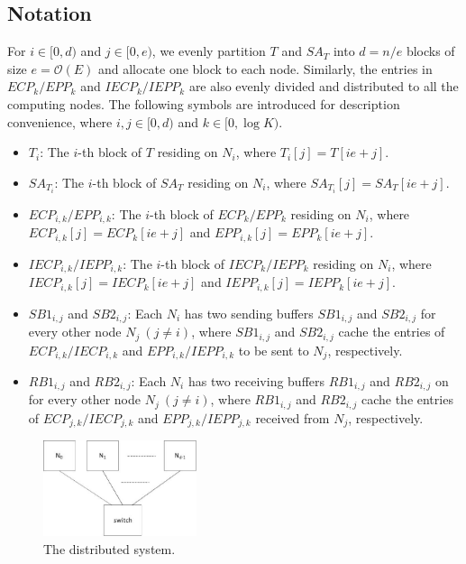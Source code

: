 \documentclass[10pt,journal,compsoc]{IEEEtran}
\begin{document}
\begin{CJK*}{GBK}{song}
\subsection{Notation}

For $i\in [0,d)$ and $j\in [0,e)$, we evenly partition $T$ and $SA_T$ into $d=n/e$ blocks of size $e=\mathcal{O}(E)$ and allocate one block to each node. Similarly, the entries in $ECP_k/EPP_k$ and $IECP_k/IEPP_k$ are also evenly divided and distributed to all the computing nodes. The following symbols are introduced for description convenience, where $i,j\in [0,d)$ and $k\in [0,\log K)$.

\begin{itemize}
\item $T_i$: The $i$-th block of $T$ residing on $N_i$, where $T_i[j] = T[ie+j]$.
\item $SA_{T_i}$: The $i$-th block of $SA_T$ residing on $N_i$, where $SA_{T_i}[j] = SA_T[ie+j]$.
\item $ECP_{i,k}/EPP_{i,k}$: The $i$-th block of $ECP_{k}/EPP_{k}$ residing on $N_i$, where $ECP_{i,k}[j] = ECP_k[ie+j]$ and $EPP_{i,k}[j] = EPP_k[ie+j]$.
\item $IECP_{i,k}/IEPP_{i,k}$: The $i$-th block of $IECP_{k}/IEPP_{k}$ residing on $N_i$, where $IECP_{i,k}[j] = IECP_k[ie+j]$ and $IEPP_{i,k}[j] = IEPP_k[ie+j]$.
\item $SB1_{i,j}$ and $SB2_{i,j}$: Each $N_i$ has two sending buffers $SB1_{i,j}$ and $SB2_{i,j}$ for every other node $N_j~(j\ne i)$, where $SB1_{i,j}$ and $SB2_{i,j}$ cache the entries of $ECP_{i,k}/IECP_{i,k}$ and $EPP_{i,k}/IEPP_{i,k}$ to be sent to $N_j$, respectively.
\item $RB1_{i,j}$ and $RB2_{i,j}$: Each $N_i$ has two receiving buffers $RB1_{i,j}$ and $RB2_{i,j}$ on for every other node $N_j~(j\ne i)$, where $RB1_{i,j}$ and $RB2_{i,j}$ cache the entries of $ECP_{j,k}/IECP_{j,k}$ and $EPP_{j,k}/IEPP_{j,k}$ received from $N_j$, respectively.
\end{itemize}

\begin{figure}[hbtp!]
  \centering
  \includegraphics[width=0.4\textwidth]{distributed_system.eps}
  \caption{The distributed system. }
  \label{fig:distributed_system}
\end{figure}



\end{CJK*}
\end{document}
